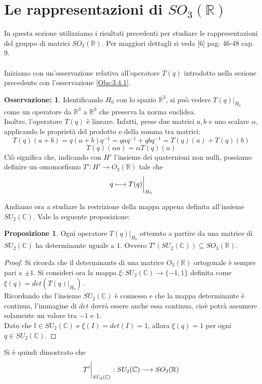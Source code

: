 \documentclass[12pt,a4paper]{report}
\theoremstyle{definition}
\theoremstyle{Theorem}
\newtheorem{Prop}[Def]{Proposizione}
\theoremstyle{definition}
\theoremstyle{definition}
\theoremstyle{definition}
\newtheorem{Obs}[Def]{Osservazione:}
\begin{document}
\section{Le rappresentazioni di $SO_3(\mathbb{R})$}
In questa sezione utilizziamo i risultati precedenti per studiare le rappresentazioni del gruppo di matrici $SO_3(\mathbb{R})$. Per maggiori dettagli si veda [6] pag. 46-48 cap. 9.\\
\\
Iniziamo con un'osservazione relativa all'operatore $T(q)$ introdotto nella sezione precedente con l'osservazione \ref{Obs:3.4.1}.
\begin{Obs}
	Identificando $H_0$ con lo spazio $\mathbb{R}^3$, si può vedere $T(q)|_{H_0}$ come un operatore da $\mathbb{R}^3$ a $\mathbb{R}^3$ che preserva la norma euclidea.\\
	Inoltre, l'operatore $T(q)$ è lineare. Infatti, prese due matrici $a,b$ e uno scalare $\alpha$, applicando le proprietà del prodotto e della somma tra matrici: $$T(q)(a+b)=q(a+b)q^{-1}=qaq^{-1}+qbq^{-1}=T(q)(a)+T(q)(b)
	$$
	$$T(q)(\alpha a)=\alpha T(q)(a)$$
	Ciò significa che, indicando con $H'$ l'insieme dei quaternioni non nulli, possiamo definire un omomorfismo $T':H'\rightarrow O_3(\mathbb{R})$ tale che
	$$q\longmapsto T(q)\bigg{\rvert}_{H_0}$$
\end{Obs}
Andiamo ora a studiare la restrizione della mappa appena definita all'insieme $SU_2(\mathbb{C})$. Vale la seguente proposizione:
\begin{Prop}
	Ogni operatore $T(q)|_{H_0}$ ottenuto a partire da una matrice di $SU_2(\mathbb{C})$ ha determinante uguale a $1$. Ovvero $T'(SU_2(\mathbb{C}))\subseteq SO_3(\mathbb{R})$. 
\end{Prop}
\begin{proof}
	Si ricorda che il determinante di una matrice $O_3(\mathbb{R})$ ortogonale è sempre pari a $\pm 1$.
	Si consideri ora la mappa $\xi:SU_2(\mathbb{C})\longrightarrow \{-1,1\}$ definita come $\xi(q)=det(T(q)|_{H_0})$.\\
	Ricordando che l'insieme $SU_2(\mathbb{C})$ è connesso e che la mappa determinante è continua, l'immagine di $det$ dovrà essere anche essa continua, cioè potrà assumere solamente un valore tra $-1$ e $1$.\\
	Dato che $\mathbb{I}\in SU_2(\mathbb{C})$ e $\xi(I)=det(I)=1$, allora $\xi(q)=1$ per ogni $q\in SU_2(\mathbb{C})$.
\end{proof}
Si è quindi dimostrato che 
$$T'\bigg{\rvert}_{SU_2(\mathbb{C})}:SU_2(\mathbb{C})\longrightarrow SO_3(\mathbb{R})$$
\end{document}
